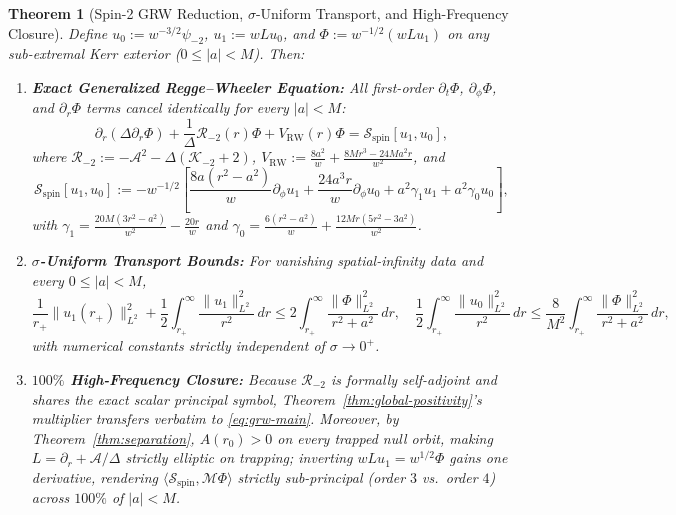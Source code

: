 \documentclass[11pt, a4paper]{article}
\newtheorem{theorem}{Theorem}[section]
\theoremstyle{remark}
\begin{document}
\begin{theorem}[Spin-2 GRW Reduction, $\sigma$-Uniform Transport, and High-Frequency Closure]
\label{thm:spin2}
Define $u_0 := w^{-3/2}\psi_{-2}$, $u_1 := w L u_0$, and $\Phi := w^{-1/2}(w L u_1)$ on any sub-extremal Kerr exterior ($0 \le |a| < M$). Then:
\begin{enumerate}
\item \textbf{Exact Generalized Regge--Wheeler Equation:} All first-order $\partial_t\Phi$, $\partial_\phi\Phi$, and $\partial_r\Phi$ terms cancel identically for every $|a| < M$:
\begin{equation}
\label{eq:grw-main}
\partial_r(\Delta\partial_r\Phi) + \frac{1}{\Delta}\mathcal{R}_{-2}(r)\Phi + V_{\mathrm{RW}}(r)\Phi = \mathcal{S}_{\mathrm{spin}}[u_1, u_0],
\end{equation}
where $\mathcal{R}_{-2} := -\mathcal{A}^2 - \Delta(\mathcal{K}_{-2} + 2)$, $V_{\mathrm{RW}} := \frac{8a^2}{w} + \frac{8Mr^3 - 24Ma^2 r}{w^2}$, and
\begin{equation}
\mathcal{S}_{\mathrm{spin}}[u_1, u_0] := -w^{-1/2}\!\left[\frac{8a(r^2 - a^2)}{w}\partial_\phi u_1 + \frac{24a^3 r}{w}\partial_\phi u_0 + a^2\gamma_1 u_1 + a^2\gamma_0 u_0\right],
\end{equation}
with $\gamma_1 = \frac{20M(3r^2 - a^2)}{w^2} - \frac{20r}{w}$ and $\gamma_0 = \frac{6(r^2 - a^2)}{w} + \frac{12Mr(5r^2 - 3a^2)}{w^2}$.
\item \textbf{$\sigma$-Uniform Transport Bounds:} For vanishing spatial-infinity data and every $0 \le |a| < M$,
\begin{equation}
\frac{1}{r_+}\|u_1(r_+)\|_{L^2}^2 + \frac{1}{2}\int_{r_+}^\infty \frac{\|u_1\|_{L^2}^2}{r^2}\,dr \le 2\int_{r_+}^\infty \frac{\|\Phi\|_{L^2}^2}{r^2 + a^2}\,dr, \quad \frac{1}{2}\int_{r_+}^\infty \frac{\|u_0\|_{L^2}^2}{r^2}\,dr \le \frac{8}{M^2}\int_{r_+}^\infty \frac{\|\Phi\|_{L^2}^2}{r^2 + a^2}\,dr,
\end{equation}
with numerical constants strictly independent of $\sigma \to 0^+$.
\item \textbf{$100\%$ High-Frequency Closure:} Because $\mathcal{R}_{-2}$ is formally self-adjoint and shares the exact scalar principal symbol, Theorem~\ref{thm:global-positivity}'s multiplier transfers verbatim to \eqref{eq:grw-main}. Moreover, by Theorem~\ref{thm:separation}, $A(r_0) > 0$ on every trapped null orbit, making $L = \partial_r + \mathcal{A}/\Delta$ strictly elliptic on trapping; inverting $w L u_1 = w^{1/2}\Phi$ gains one derivative, rendering $\langle\mathcal{S}_{\mathrm{spin}}, \mathcal{M}\Phi\rangle$ strictly sub-principal (order $3$ vs.\ order $4$) across $100\%$ of $|a| < M$.
\end{enumerate}
\end{theorem}
\end{document}

